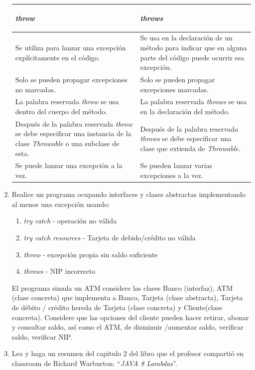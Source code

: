 \documentclass[12pt]{article}
\begin{document}
\begin{enumerate}
    \begin{table}[h!]
      \centering
      \begin{tabular}{|p{}|p{}|}
        \hline
        \begin{center} \textbf{\textit{throw}} \end{center} & \begin{center} \textbf{\textit{throws}} \end{center} \\ \hline 
        Se utiliza para lanzar una excepción explícitamente en el código. & Se usa en la declaración de un método para indicar que en alguna parte del código puede ocurrir esa excepción. \\ \hline
        Solo se pueden propagar excepciones no marcadas. & Solo se pueden propagar excepciones marcadas. \\ \hline
        La palabra reservada \textit{throw} se usa dentro del cuerpo del método. & La palabra reservada \textit{throws} se usa en la declaración del método. \\ \hline
        Después de la palabra reservada \textit{throw} se debe especificar una instancia de la clase \textit{Throwable} o una subclase de esta. & Después de la palabra reservada \textit{throws} se debe especificar una clase que extienda de \textit{Throwable}. \\ \hline
        Se puede lanzar una excepción a la vez. & Se pueden lanzar varias excepciones a la vez. \\ \hline
      \end{tabular}
    \end{table}

    \item Realice un programa ocupando interfaces y clases abstractas implementando al menos una excepción usando:
    \begin{enumerate}[label=\alph*.]
      \item \textit{try catch} - operación no válida
      \item \textit{try catch resources} - Tarjeta de debido/crédito no válida
      \item \textit{throw} - excepción propia sin saldo suficiente
      \item \textit{throws} - NIP incorrecto
    \end{enumerate}
    El programa simula un ATM considere las clases Banco (interfaz), ATM (clase concreta) que implementa a Banco, Tarjeta (clase abstracta), Tarjeta de débito / crédito hereda de Tarjeta (clase concreta) y Cliente(clase concreta). Considere que las opciones del cliente pueden hacer retirar, abonar y consultar saldo, así como el ATM, de disminuir /aumentar saldo, verificar saldo, verificar NIP.


    \item Lea y haga un resumen del capitulo 2 del libro que el profesor compartió en classroom de Richard Warburton: “\textit{JAVA 8 Lambdas}”.
  \end{enumerate}
\end{document}

